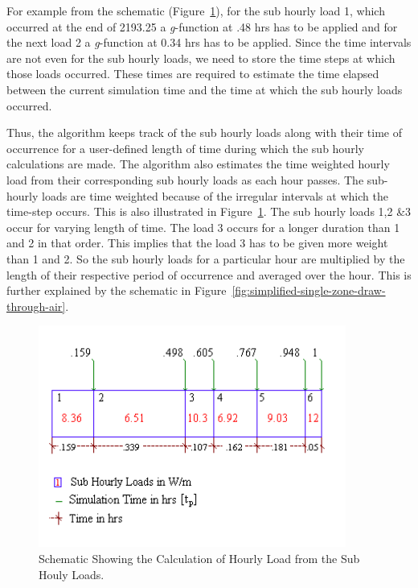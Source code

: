 For example from the schematic (Figure~\ref{fig:schematic-showing-the-calculation-of-hourly}), for the sub hourly load 1, which occurred at the end of 2193.25 a \emph{g}-function at .48 hrs has to be applied and for the next load 2 a \emph{g}-function at 0.34 hrs has to be applied. Since the time intervals are not even for the sub hourly loads, we need to store the time steps at which those loads occurred. These times are required to estimate the time elapsed between the current simulation time and the time at which the sub hourly loads occurred.

Thus, the algorithm keeps track of the sub hourly loads along with their time of occurrence for a user-defined length of time during which the sub hourly calculations are made. The algorithm also estimates the time weighted hourly load from their corresponding sub hourly loads as each hour passes. The sub-hourly loads are time weighted because of the irregular intervals at which the time-step occurs. This is also illustrated in Figure~\ref{fig:schematic-showing-the-calculation-of-hourly}. The sub hourly loads 1,2 \&3 occur for varying length of time. The load 3 occurs for a longer duration than 1 and 2 in that order. This implies that the load 3 has to be given more weight than 1 and 2. So the sub hourly loads for a particular hour are multiplied by the length of their respective period of occurrence and averaged over the hour. This is further explained by the schematic in Figure~\ref{fig:simplified-single-zone-draw-through-air}.

\begin{figure}[hbtp] %
\centering
\includegraphics[width=0.9\textwidth, height=0.9\textheight, keepaspectratio=true]{media/image5657.png}
\caption{Schematic Showing the Calculation of Hourly Load from the Sub Houly Loads. \protect \label{fig:schematic-showing-the-calculation-of-hourly}}
\end{figure}

